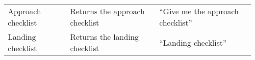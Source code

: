 \begin{table}[!h]
\begin{tabular}{|p{0.2\paperwidth}|p{0.5\paperwidth}|p{0.4\paperwidth}|}
\rowcolor{lightgray} \multicolumn{3}{|l|}{Checklists} \\ \hline
Approach checklist & Returns the approach checklist & ``Give me the approach checklist''  \\ 
\hline 
Landing checklist  & Returns the landing checklist & ``Landing checklist''  \\ 
\hline 
\end{tabular}

\end{table}
